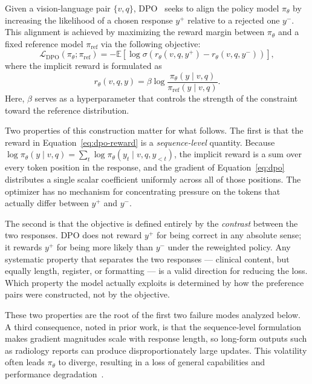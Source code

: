 Given a vision-language pair $\{v, q\}$, DPO~\cite{rafailov2023direct} seeks to align the policy model $\pi_\theta$ by increasing the likelihood of a chosen response $y^+$ relative to a rejected one $y^-$. This alignment is achieved by maximizing the reward margin between $\pi_\theta$ and a fixed reference model $\pi_{\text{ref}}$ via the following objective:
\begin{equation}\label{eq:dpo}
\mathcal{L}_{\text{DPO}}(\pi_{\theta};\pi_{\text{ref}}) = -\mathbb{E} \left[ \log \sigma \left( r_\theta(v,q,y^+) - r_\theta(v,q,y^-) \right) \right],
\end{equation}
where the implicit reward is formulated as
\begin{equation}\label{eq:dpo-reward}
r_\theta(v,q,y) = \beta \log \frac{\pi_{\theta}(y \mid v,q)}{\pi_{\text{ref}}(y \mid v,q)}.
\end{equation}
Here, $\beta$ serves as a hyperparameter that controls the strength of the constraint toward the reference distribution.

Two properties of this construction matter for what follows. The first is that the reward in Equation~\ref{eq:dpo-reward} is a \emph{sequence-level} quantity. Because $\log \pi_\theta(y \mid v, q) = \sum_t \log \pi_\theta(y_t \mid v, q, y_{<t})$, the implicit reward is a sum over every token position in the response, and the gradient of Equation~\ref{eq:dpo} distributes a single scalar coefficient uniformly across all of those positions. The optimizer has no mechanism for concentrating pressure on the tokens that actually differ between $y^+$ and $y^-$.

The second is that the objective is defined entirely by the \emph{contrast} between the two responses. DPO does not reward $y^+$ for being correct in any absolute sense; it rewards $y^+$ for being more likely than $y^-$ under the reweighted policy. Any systematic property that separates the two responses --- clinical content, but equally length, register, or formatting --- is a valid direction for reducing the loss. Which property the model actually exploits is determined by how the preference pairs were constructed, not by the objective.

These two properties are the root of the first two failure modes analyzed below. A third consequence, noted in prior work, is that the sequence-level formulation makes gradient magnitudes scale with response length, so long-form outputs such as radiology reports can produce disproportionately large updates. This volatility often leads $\pi_\theta$ to diverge, resulting in a loss of general capabilities and performance degradation~\cite{xu2024dpo, yan20243d, cho2025rethinking}.

